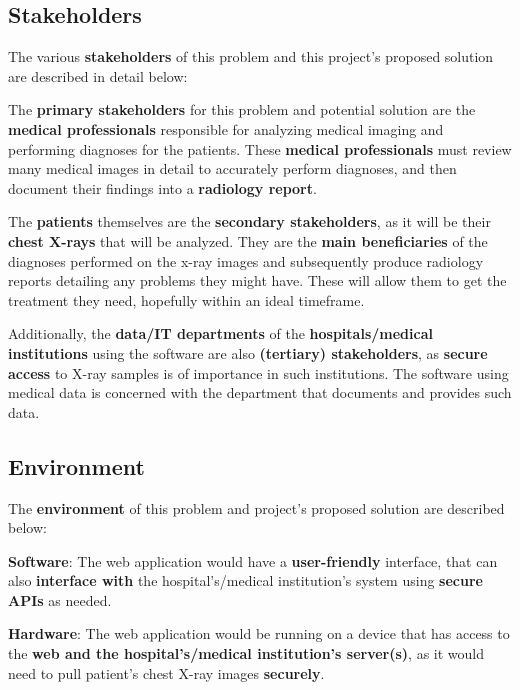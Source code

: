 \documentclass{article}
\begin{document}
\subsection{Stakeholders}

The various \textbf{stakeholders} of this problem and this project's proposed solution are described in detail below:

\begin{itemize}
\begin{item}
The \textbf{primary stakeholders} for this problem and potential solution are the \textbf{medical professionals} responsible for analyzing medical imaging and performing diagnoses for the patients.
These \textbf{medical professionals} must review many medical images in detail to accurately perform diagnoses, and then document their findings into a \textbf{radiology report}.
\end{item}
\begin{item}
The \textbf{patients} themselves are the \textbf{secondary stakeholders}, as it will be their \textbf{chest X-rays} that will be analyzed.
They are the \textbf{main beneficiaries} of the diagnoses performed on the x-ray images and subsequently produce radiology reports detailing any problems they might have.
These will allow them to get the treatment they need, hopefully within an ideal timeframe.
\end{item}
\begin{item}
Additionally, the \textbf{data/IT departments} of the \textbf{hospitals/medical institutions} using the software are also \textbf{(tertiary) stakeholders}, as \textbf{secure access} to X-ray samples is of importance in such institutions.
The software using medical data is concerned with the department that documents and provides such data.
\end{item}
\end{itemize}

\subsection{Environment}

The \textbf{environment} of this problem and project's proposed solution are described below:

\begin{itemize}
\begin{item}
\noindent \textbf{Software}: The web application would have a \textbf{user-friendly} interface, that can also \textbf{interface with} the hospital’s/medical institution's system using \textbf{secure APIs} as needed.
\end{item}
\begin{item}
\noindent \textbf{Hardware}: The web application would be running on a device that has access to the \textbf{web and the hospital’s/medical institution's server(s)}, as it would need to pull patient's chest X-ray images \textbf{securely}.
\end{item}
\end{itemize}
\end{document}
